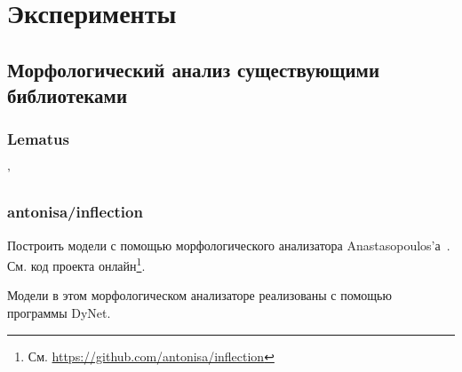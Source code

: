 \chapter{Эксперименты} \label{chapt_exp}

\section{Морфологический анализ существующими библиотеками} \label{sect_exp_libs}



\subsection{Lematus} \label{sect_exp_lematus}'




\subsection{antonisa/inflection}

Построить модели с помощью морфологического анализатора 
Anastasopoulos'а~\cite{Anastasopoulos2019Pushing_Limits_Low-Resource_MI}.
См. код проекта онлайн\footnote{См. \url{https://github.com/antonisa/inflection}}. 

Модели в этом морфологическом анализаторе реализованы с помощью программы DyNet. 



